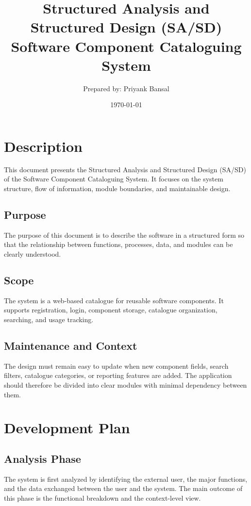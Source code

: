 \documentclass[12pt]{article}
\title{\textbf{Structured Analysis and Structured Design (SA/SD)}\\
Software Component Cataloguing System}
\author{Prepared by: Priyank Bansal}
\date{\today}
\begin{document}
\maketitle
\tableofcontents
\newpage

\section{Description}
This document presents the Structured Analysis and Structured Design (SA/SD) of the Software Component Cataloguing System. It focuses on the system structure, flow of information, module boundaries, and maintainable design.

\subsection{Purpose}
The purpose of this document is to describe the software in a structured form so that the relationship between functions, processes, data, and modules can be clearly understood.

\subsection{Scope}
The system is a web-based catalogue for reusable software components. It supports registration, login, component storage, catalogue organization, searching, and usage tracking.

\subsection{Maintenance and Context}
The design must remain easy to update when new component fields, search filters, catalogue categories, or reporting features are added. The application should therefore be divided into clear modules with minimal dependency between them.

\section{Development Plan}

\subsection{Analysis Phase}
The system is first analyzed by identifying the external user, the major functions, and the data exchanged between the user and the system. The main outcome of this phase is the functional breakdown and the context-level view.
\end{document}

